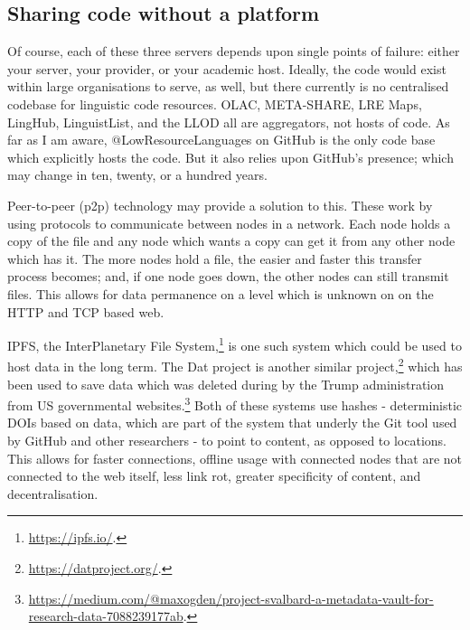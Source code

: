 \subsection{Sharing code without a platform}
\label{subsec:sharing-code-without-a-platform}

Of course, each of these three servers depends upon single points of failure: either your server, your provider, or your academic host. Ideally, the code would exist within large organisations to serve, as well, but there currently is no centralised codebase for linguistic code resources. OLAC, META-SHARE, LRE Maps, LingHub, LinguistList, and the LLOD all are aggregators, not hosts of code. As far as I am aware, @LowResourceLanguages on GitHub is the only code base which explicitly hosts the code. But it also relies upon GitHub's presence; which may change in ten, twenty, or a hundred years.

Peer-to-peer (p2p) technology may provide a solution to this. These work by using protocols to communicate between nodes in a network. Each node holds a copy of the file and any node which wants a copy can get it from any other node which has it. The more nodes hold a file, the easier and faster this transfer process becomes; and, if one node goes down, the other nodes can still transmit files. This allows for data permanence on a level which is unknown on on the HTTP and TCP based web.

IPFS, the InterPlanetary File System,\footnote{\href{https://ipfs.io/}{https://ipfs.io/}. } is one such system which could be used to host data in the long term. The Dat project is another similar project,\footnote{\href{https://datproject.org/}{https://datproject.org/}. } which has been used to save data which was deleted during by the Trump administration from US governmental websites.\footnote{\href{https://medium.com/@maxogden/project-svalbard-a-metadata-vault-for-research-data-7088239177ab}{https://medium.com/@maxogden/project-svalbard-a-metadata-vault-for-research-data-7088239177ab}. } Both of these systems use hashes - deterministic DOIs based on data, which are part of the system that underly the Git tool used by GitHub and other researchers - to point to content, as opposed to locations. This allows for faster connections, offline usage with connected nodes that are not connected to the web itself, less link rot, greater specificity of content, and decentralisation.

